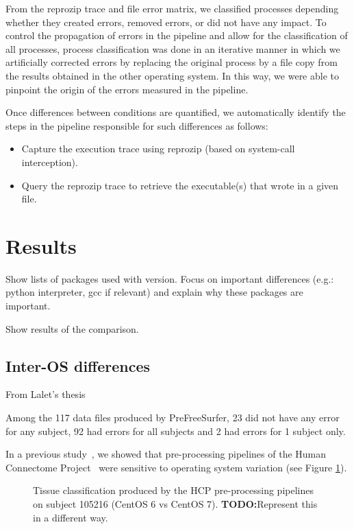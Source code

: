 \documentclass{article}
\newcommand{\todo}[1]{\color{red}\textbf{TODO:}#1\color{black}}
\begin{document}
From the reprozip trace and file error matrix, we classified
 processes depending whether they created errors, removed errors, or
 did not have any impact. To control the propagation of errors in the
 pipeline and allow for the classification of all processes, process
 classification was done in an iterative manner in which we
 artificially corrected errors by replacing the original process by a
 file copy from the results obtained in the other operating system. In
 this way, we were able to pinpoint the origin of the errors measured
 in the pipeline.

 Once differences between conditions are quantified, we automatically identify the steps in the pipeline responsible for such differences as follows:
\begin{itemize}
\item Capture the execution trace using reprozip (based on system-call interception).
\item Query the reprozip trace to retrieve the executable(s) that wrote in a given file.
\end{itemize}

\section{Results}

Show lists of packages used with version. Focus on important
differences (e.g.: python interpreter, gcc if relevant) and explain
why these packages are important.

Show results of the comparison.

\subsection{Inter-OS differences}


From Lalet's thesis

Among the 117 data files produced by PreFreeSurfer, 23 did not have any error for any subject, 92 had errors 
for all subjects and 2 had errors for 1 subject only. 

In a previous study~\cite{Scaria2017}, we showed that
pre-processing pipelines of the Human Connectome
Project~\cite{Glasser2013} were sensitive to operating system
variation (see Figure \ref{fig:1}).
\begin{figure}
  \caption{Tissue classification produced by the HCP pre-processing
    pipelines on subject 105216 (CentOS 6 vs CentOS 7). \todo{Represent this in a different way.}}
  \label{fig:1}
\end{figure}
\end{document}

